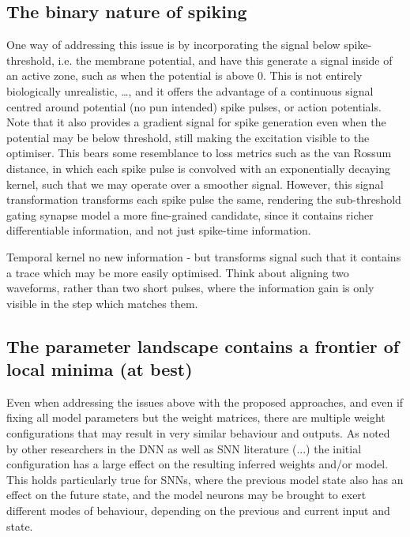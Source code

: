 \documentclass[mphil,deptreport,ianc]{infthesis} %
\begin{document}
\subsection*{The binary nature of spiking}
One way of addressing this issue is by incorporating the signal below spike-threshold, i.e. the membrane potential, and have this generate a signal inside of an active zone, such as when the potential is above 0. This is not entirely biologically unrealistic, …, and it offers the advantage of a continuous signal centred around potential (no pun intended) spike pulses, or action potentials. Note that it also provides a gradient signal for spike generation even when the potential may be below threshold, still making the excitation visible to the optimiser.
This bears some resemblance to loss metrics such as the van Rossum distance, in which each spike pulse is convolved with an exponentially decaying kernel, such that we may operate over a smoother signal. However, this signal transformation transforms each spike pulse the same, rendering the sub-threshold gating synapse model a more fine-grained candidate, since it contains richer differentiable information, and not just spike-time information.

Temporal kernel no new information - but transforms signal such that it contains a trace which may be more easily optimised. Think about aligning two waveforms, rather than two short pulses, where the information gain is only visible in the step which matches them.


\subsection*{The parameter landscape contains a frontier of local minima (at best)}
Even when addressing the issues above with the proposed approaches, and even if fixing all model parameters but the weight matrices, there are multiple weight configurations that may result in very similar behaviour and outputs.
As noted by other researchers in the DNN as well as SNN literature (...) the initial configuration has a large effect on the resulting inferred weights and/or model. This holds particularly true for SNNs, where the previous model state also has an effect on the future state, and the model neurons may be brought to exert different modes of behaviour, depending on the previous and current input and state.
\end{document}

